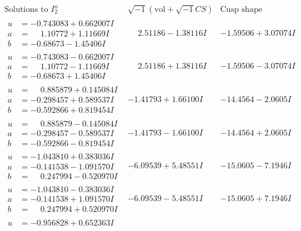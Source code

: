 \documentclass[1p]{elsarticle_modified}
\theoremstyle{definition}
\newcommand{\I}{\sqrt{-1}}
\begin{document}
$$\begin{array}{c|c|c}  
\text{Solutions to }I^u_{2}& \I (\text{vol} + \sqrt{-1}CS) & \text{Cusp shape}\\
 \hline 
\begin{aligned}
u &= -0.743083 + 0.662007 I \\
a &= \phantom{-}1.10772 + 1.11669 I \\
b &= -0.68673 - 1.45406 I\end{aligned}
 & \phantom{-}2.51186 - 1.38116 I & -1.59506 + 3.07074 I \\ \hline\begin{aligned}
u &= -0.743083 - 0.662007 I \\
a &= \phantom{-}1.10772 - 1.11669 I \\
b &= -0.68673 + 1.45406 I\end{aligned}
 & \phantom{-}2.51186 + 1.38116 I & -1.59506 - 3.07074 I \\ \hline\begin{aligned}
u &= \phantom{-}0.885879 + 0.145084 I \\
a &= -0.298457 + 0.589537 I \\
b &= -0.592866 + 0.819454 I\end{aligned}
 & -1.41793 + 1.66100 I & -14.4564 - 2.0605 I \\ \hline\begin{aligned}
u &= \phantom{-}0.885879 - 0.145084 I \\
a &= -0.298457 - 0.589537 I \\
b &= -0.592866 - 0.819454 I\end{aligned}
 & -1.41793 - 1.66100 I & -14.4564 + 2.0605 I \\ \hline\begin{aligned}
u &= -1.043810 + 0.383036 I \\
a &= -0.141538 - 1.091570 I \\
b &= \phantom{-}0.247994 - 0.520970 I\end{aligned}
 & -6.09539 + 5.48551 I & -15.0605 - 7.1946 I \\ \hline\begin{aligned}
u &= -1.043810 - 0.383036 I \\
a &= -0.141538 + 1.091570 I \\
b &= \phantom{-}0.247994 + 0.520970 I\end{aligned}
 & -6.09539 - 5.48551 I & -15.0605 + 7.1946 I \\ \hline\begin{aligned}
u &= -0.956828 + 0.652363 I \\

\end{aligned}
\end{array}$$
\end{document}
